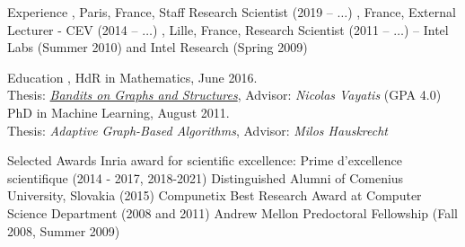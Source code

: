 \documentclass{resume}
\begin{document}
\begin{small}\maketitle\end{small}







\vspace{-2.3em}
\begin{category}{Experience}
\setlength\itemsep{0.2em}
, Paris, France,
Staff Research Scientist (2019 -- $\dots$) 
, France, 
External Lecturer - CEV (2014 -- $\dots$)
, Lille, France,
Research Scientist (2011 -- $\dots$) 
 -- Intel Labs (Summer 2010) and Intel Research 
(Spring 2009)
\end{category}
\vspace{-0.5cm}
\begin{category}{Education}
\setlength\itemsep{0.15em}
, HdR in Mathematics, June 2016.\\
Thesis: \href{http://researchers.lille.inria.fr/~valko/hp/publications/valko2016bandits.pdf}{\emph{Bandits on Graphs and Structures}}, Advisor: \emph{Nicolas Vayatis}
 (GPA 4.0)
PhD in Machine Learning, August 2011. \\ Thesis: \emph{Adaptive Graph-Based Algorithms}, Advisor: \emph{Milos Hauskrecht}
\end{category}
\vspace{-0.5cm}
\begin{category}{Selected Awards}
\setlength\itemsep{0.1em}
	\citemnobullet Inria award for scientific excellence:
Prime d'excellence scientifique (2014 - 2017, 2018-2021)
\citemnobullet Distinguished Alumni of Comenius University, Slovakia (2015)
	\citemnobullet Compunetix Best Research Award at Computer Science 
Department (2008 
and 2011)	
       \citemnobullet Andrew Mellon Predoctoral Fellowship (Fall 2008, Summer 
2009)	
\end{category}
\end{document}

